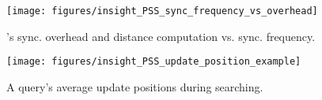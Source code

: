 \begin{figure}[t]
    \begin{minipage}[t]{0.23\textwidth}
        \centering
        \texttt{[image: figures/insight\_PSS\_sync\_frequency\_vs\_overhead]}
        \caption{\Hammer's sync. overhead and distance computation vs. sync. frequency.}
        \label{fig:insight_PSS_sync_frequency_vs_overhead}
    \end{minipage}
    \hfill
    \begin{minipage}[t]{0.23\textwidth}
        \centering
        \texttt{[image: figures/insight\_PSS\_update\_position\_example]}
        \caption{A query's average update positions during searching.
        }
        \label{fig:insight_PSS_update_position_example}
    \end{minipage}
\end{figure}







